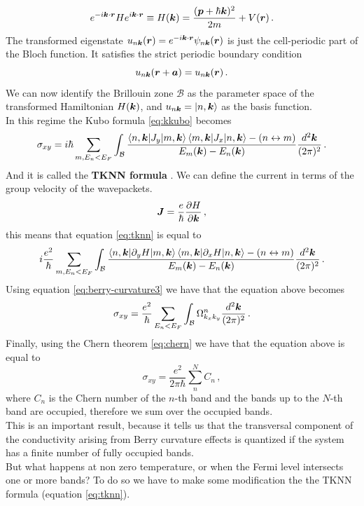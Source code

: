 \begin{equation}
    e^{-i\boldsymbol{k}\cdot \boldsymbol{r}}He^{i\boldsymbol{k}\cdot \boldsymbol{r}}\equiv H(\boldsymbol{k})= \frac {(\boldsymbol{p}+\hbar \boldsymbol{k})^2}{2m} + V(\boldsymbol{r})\,.
    \label{eq:k-repr}
\end{equation}
The transformed eigenstate $u_{n\boldsymbol{k}}(\boldsymbol{r})= e^{-i\boldsymbol{k}\cdot \boldsymbol{r}}\psi_{n\boldsymbol{k}}(\boldsymbol{r})$ is just the cell-periodic part of the Bloch function. It satisfies the strict periodic boundary condition 
\begin{equation}
    u_{n\boldsymbol{k}}(\boldsymbol{r}+\boldsymbol{a})=u_{n\boldsymbol{k}}(\boldsymbol{r})\,.
\end{equation}
We can now identify the Brillouin zone $\mathcal B$ as the parameter space of the transformed Hamiltonian $H(\boldsymbol{k})$, and $u_{n\boldsymbol{k}}=\ket{n,\boldsymbol{k}}$ as the basis function.\\
In this regime the Kubo formula \ref{eq:kkubo} becomes 
\begin{equation}
    \sigma_{xy}=i\hbar\sum_{m,E_n<E_F}\int_{\mathcal B}
    \frac{
        \braket{n,\boldsymbol{k}|J_y}{m,\boldsymbol{k}}\braket{m,\boldsymbol{k}|J_x}{n,\boldsymbol{k}} - (n\leftrightarrow m)
    }
    {
        E_m(\boldsymbol{k})-E_n(\boldsymbol{k})
    }
    \frac{d^2\boldsymbol{k}}{(2\pi)^2}\,.
    \label{eq:tknn}
\end{equation}
And it is called the \textbf{TKNN formula} \cite{thouless1982quantized}. We can define the current in terms of the group velocity of the wavepackets.
\begin{equation}
    \boldsymbol{J}=\frac e\hbar \frac{\partial H}{\partial \boldsymbol{k}}\,,
\end{equation}
this means that equation \ref{eq:tknn} is equal to
\begin{equation}
    i\frac{e^2}{\hbar}
    \sum_{m,E_n<E_F}\int_{\mathcal B}
    \frac{
        \braket{n,\boldsymbol{k}|\partial_y H}{m,\boldsymbol{k}}\braket{m,\boldsymbol{k}|\partial_x H}{n,\boldsymbol{k}} - (n\leftrightarrow m)
    }
    {
        E_m(\boldsymbol{k})-E_n(\boldsymbol{k})
    }
    \frac {d^2\boldsymbol{k}}{(2\pi)^2}\,.
\end{equation}
Using equation \ref{eq:berry-curvature3} we have that the equation above becomes
\begin{equation}
    \sigma_{xy}=\frac{e^2}\hbar \sum_{E_n<E_F}\int_{\mathcal B}\Omega^n_{k_xk_y}\frac {d^2\boldsymbol{k}}{(2\pi)^2}\,.
    \label{eq:fermi-cond}
\end{equation}
Finally, using the Chern theorem \ref{eq:chern} we have that the equation above is equal to 
\begin{equation}
    \sigma_{xy}=\frac{e^2}{2\pi\hbar}\sum_n^N C_n\,,
    \label{eq:chern-sigma-1}
\end{equation}
where $C_n$ is the Chern number of the $n$-th band and the bands up to the $N$-th band are occupied, therefore we sum over the occupied bands.\\
This is an important result, because it tells us that the transversal component of the conductivity arising from Berry curvature effects is quantized if the system has a finite number of fully occupied bands.\\ But what happens at non zero temperature, or when the Fermi level intersects one or more bands? To do so we have to make some modification the the TKNN formula (equation \ref{eq:tknn}).

